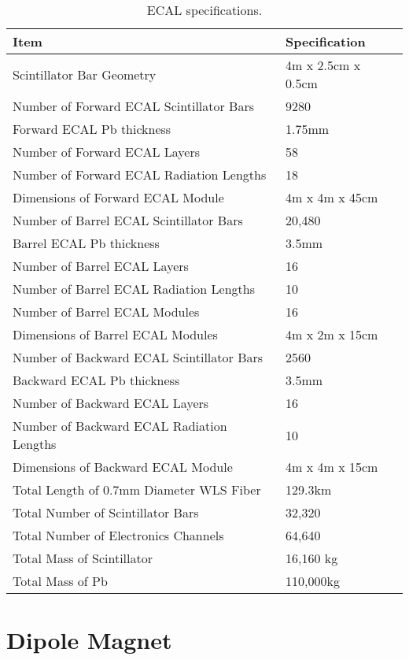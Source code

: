 \begin{table}
\centering
  \caption{\label{ECAL_specs} ECAL specifications.}
  \begin{tabular}{| l | l |}
    \hline
Item&Specification \\
    \hline
Scintillator Bar Geometry & 4m x 2.5cm x 0.5cm \\
Number of Forward ECAL Scintillator Bars & 9280 \\
Forward ECAL Pb thickness & 1.75mm \\
Number of Forward ECAL Layers & 58 \\
Number of Forward ECAL Radiation Lengths & 18 \\
Dimensions of Forward ECAL Module & 4m x 4m x 45cm \\
Number of Barrel ECAL Scintillator Bars & 20,480 \\
Barrel ECAL Pb thickness & 3.5mm \\
Number of Barrel ECAL Layers & 16 \\
Number of Barrel ECAL Radiation Lengths & 10 \\
Number of Barrel ECAL Modules & 16 \\
Dimensions of Barrel ECAL Modules & 4m x 2m x 15cm \\
Number of Backward ECAL Scintillator Bars & 2560 \\
Backward ECAL Pb thickness & 3.5mm \\
Number of Backward ECAL Layers & 16 \\
Number of Backward ECAL Radiation Lengths & 10 \\
Dimensions of Backward ECAL Module & 4m x 4m x 15cm \\
Total Length of 0.7mm Diameter WLS Fiber & 129.3km \\
Total Number of Scintillator Bars & 32,320 \\
Total Number of Electronics Channels & 64,640 \\
Total Mass of Scintillator & 16,160 kg \\
Total Mass of Pb & 110,000kg \\
     \hline
  \end{tabular}
\end{table}

\section{Dipole Magnet} 

